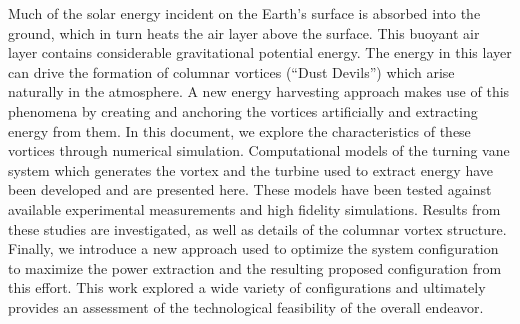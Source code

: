 \doublespacing

%

 Much of the solar energy incident on the Earth's surface is absorbed
 into the ground, which in turn heats the air layer above the surface.
 This buoyant air layer contains considerable gravitational potential
 energy. The energy in this layer can drive the formation of columnar
 vortices (``Dust Devils'') which arise naturally in the atmosphere. A
 new energy harvesting approach 
 makes use of this phenomena by creating and anchoring the vortices
 artificially and extracting energy from them. In this document, 
 we explore the characteristics of these vortices
 through numerical simulation. Computational models of the turning vane 
 system which generates the vortex and the turbine used to extract
 energy have been developed and are presented here. These models have 
 been tested against available experimental measurements and high
 fidelity simulations. Results from these studies are investigated, 
 as well as
 details of the columnar vortex structure. Finally, we introduce a new
 approach used to optimize the system configuration to maximize the
 power extraction and the resulting proposed configuration
 from this effort. This work explored a wide variety of configurations
 and ultimately provides an assessment of the technological feasibility
 of the overall endeavor.     

%
%
%


